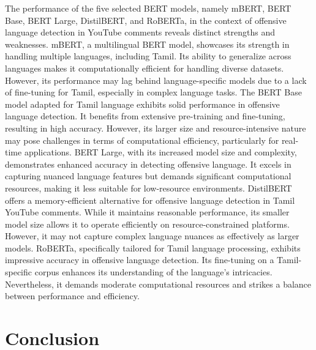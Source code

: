 \documentclass{svproc}
\begin{document}
The performance of the five selected BERT models, namely mBERT, BERT Base, BERT Large, DistilBERT, and RoBERTa, in the context of offensive language detection in YouTube comments reveals distinct strengths and weaknesses.
mBERT, a multilingual BERT model, showcases its strength in handling multiple languages, including Tamil. Its ability to generalize across languages makes it computationally efficient for handling diverse datasets. However, its performance may lag behind language-specific models due to a lack of fine-tuning for Tamil, especially in complex language tasks.
The BERT Base model adapted for Tamil language exhibits solid performance in offensive language detection. It benefits from extensive pre-training and fine-tuning, resulting in high accuracy. However, its larger size and resource-intensive nature may pose challenges in terms of computational efficiency, particularly for real-time applications.
BERT Large, with its increased model size and complexity, demonstrates enhanced accuracy in detecting offensive language. It excels in capturing nuanced language features but demands significant computational resources, making it less suitable for low-resource environments.
DistilBERT offers a memory-efficient alternative for offensive language detection in Tamil YouTube comments. While it maintains reasonable performance, its smaller model size allows it to operate efficiently on resource-constrained platforms. However, it may not capture complex language nuances as effectively as larger models.
RoBERTa, specifically tailored for Tamil language processing, exhibits impressive accuracy in offensive language detection. Its fine-tuning on a Tamil-specific corpus enhances its understanding of the language's intricacies. Nevertheless, it demands moderate computational resources and strikes a balance between performance and efficiency.

\section{Conclusion}
\end{document}
